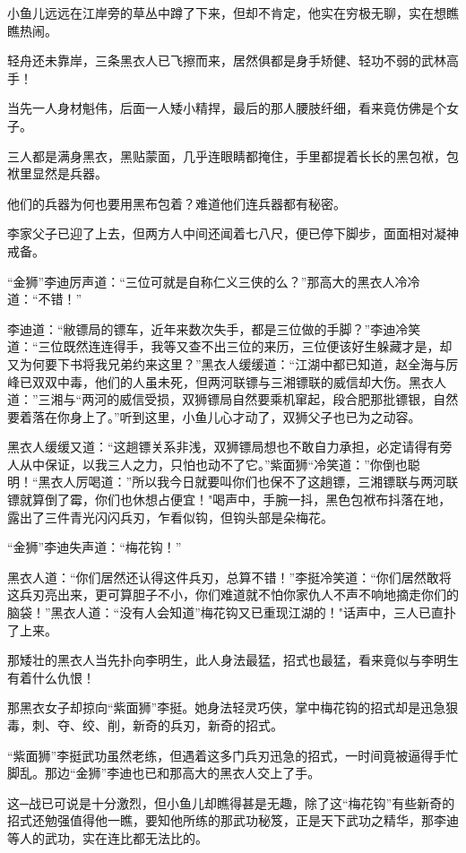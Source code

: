 \documentclass[12pt,oneside]{book}
\begin{document}
小鱼儿远远在江岸旁的草丛中蹲了下来，但却不肯定，他实在穷极无聊，实在想瞧瞧热闹。

轻舟还未靠岸，三条黑衣人已飞擦而来，居然俱都是身手矫健、轻功不弱的武林高手！

当先一人身材魁伟，后面一人矮小精捍，最后的那人腰肢纤细，看来竟仿佛是个女子。

三人都是满身黑衣，黑贴蒙面，几乎连眼睛都掩住，手里都提着长长的黑包袱，包袱里显然是兵器。

他们的兵器为何也要用黑布包着？难道他们连兵器都有秘密。

李家父子已迎了上去，但两方人中间还闻着七八尺，便已停下脚步，面面相对凝神戒备。

``金狮''李迪厉声道：``三位可就是自称仁义三侠的么？''那高大的黑衣人冷冷道：``不错！''

李迪道：``敝镖局的镖车，近年来数次失手，都是三位做的手脚？''李迪冷笑道：``三位既然连连得手，我等又查不出三位的来历，三位便该好生躲藏才是，却又为何要下书将我兄弟约来这里？''黑衣人缓缓道：``江湖中都已知道，赵全海与厉峰已双双中毒，他们的人虽未死，但两河联镖与三湘镖联的威信却大伤。黑衣人道：''三湘与``两河的威信受损，双狮镖局自然要乘机窜起，段合肥那批镖银，自然要着落在你身上了。''听到这里，小鱼儿心才动了，双狮父子也已为之动容。

黑衣人缓缓又道：``这趟镖关系非浅，双狮镖局想也不敢自力承担，必定请得有旁人从中保证，以我三人之力，只怕也动不了它。''紫面狮``冷笑道：''你倒也聪明！``黑衣人厉喝道：''所以我今日就要叫你们也保不了这趟镖，三湘镖联与两河联镖就算倒了霉，你们也休想占便宜！"喝声中，手腕一抖，黑色包袱布抖落在地，露出了三件青光闪闪兵刃，乍看似钩，但钩头部是朵梅花。

``金狮''李迪失声道：``梅花钩！''

黑衣人道：``你们居然还认得这件兵刃，总算不错！''李挺冷笑道：``你们居然敢将这兵刃亮出来，更可算胆子不小，你们难道就不怕你家仇人不声不响地摘走你们的脑袋！''黑衣人道：``没有人会知道''梅花钩又已重现江湖的！"话声中，三人已直扑了上来。

那矮壮的黑衣人当先扑向李明生，此人身法最猛，招式也最猛，看来竟似与李明生有着什么仇恨！

那黑衣女子却掠向``紫面狮''李挺。她身法轻灵巧侠，掌中梅花钩的招式却是迅急狠毒，刺、夺、绞、削，新奇的兵刃，新奇的招式。

``紫面狮''李挺武功虽然老练，但遇着这多门兵刃迅急的招式，一时间竟被逼得手忙脚乱。那边``金狮''李迪也已和那高大的黑衣人交上了手。

这─战已可说是十分激烈，但小鱼儿却瞧得甚是无趣，除了这``梅花钩''有些新奇的招式还勉强值得他一瞧，要知他所练的那武功秘笈，正是天下武功之精华，那李迪等人的武功，实在连比都无法比的。
\end{document}
